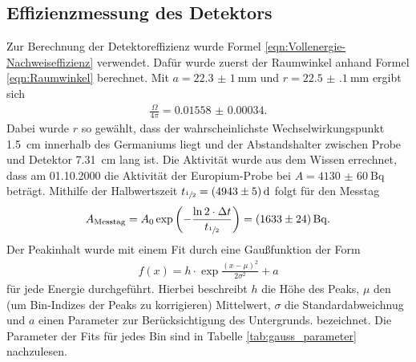 \subsection{Effizienzmessung des Detektors}
\label{sec:Effizienzmessung}

Zur Berechnung der Detektoreffizienz wurde Formel
\eqref{eqn:Vollenergie-Nachweiseffizienz} verwendet. Dafür wurde zuerst der
Raumwinkel anhand Formel \eqref{eqn:Raumwinkel} berechnet. Mit
$a = \SI{22.3(10)}{\milli\meter}$ und $r = \SI{22.5(1)}{\milli\meter}$ ergibt sich
\begin{align*}
  \frac{\Omega}{4\pi} = \num{0.01558(34)}
	.
\end{align*}
Dabei wurde $r$ so gewählt, dass der wahrscheinlichste Wechselwirkungspunkt
\SI{1.5}{\centi\meter} innerhalb des Germaniums liegt und der Abstandshalter
zwischen Probe und Detektor \SI{7.31}{\centi\meter} lang ist.
Die Aktivität wurde aus dem Wissen errechnet, dass am 01.10.2000 die Aktivität
der Europium-Probe bei $A = \SI{4130(60)}{\becquerel}$ beträgt. Mithilfe der
Halbwertszeit $t_{\sfrac{1}{2}} = \SI{4943(5)}{\day}$ folgt für den Messtag
\begin{align*}
	A_\text{Messtag} = A_0 \exp\left(-\frac{\ln{2} \cdot\Delta t}{t_{\sfrac{1}{2}}}\right)=\SI{1633(24)}{\becquerel}
	.
\end{align*}
Der Peakinhalt wurde mit einem Fit durch eine Gaußfunktion der Form
\begin{align*}
	f\left(x\right) = h\cdot \exp{\frac{(x-\mu)^2}{2\sigma^2}} + a
\end{align*}
für jede Energie durchgeführt. Hierbei beschreibt $h$ die Höhe des Peaks, $\mu$
den (um Bin-Indizes der Peaks zu korrigieren) Mittelwert, $\sigma$ die
Standardabweichnug und $a$ einen Parameter zur Berücksichtigung des Untergrunds.
bezeichnet. Die Parameter der Fits für jedes Bin sind in Tabelle
\ref{tab:gauss_parameter} nachzulesen.

\FloatBarrier

